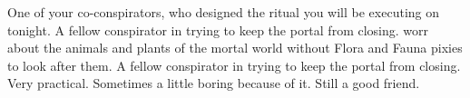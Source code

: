 \documentclass[char]{PP}
\begin{document}
\begin{itemz}[Notes]
	\item 
\end{itemz}

\begin{contacts}
	\contact{\cSLibrarian{}} One of your co-conspirators, who designed the ritual you will be executing on tonight.
	\contact{\cFHeart{}} A fellow conspirator in trying to keep the portal from closing. \cFHeart{\They} worr\cFHeart{\pluralY} about the animals and plants of the mortal world without Flora and Fauna pixies to look after them.
	\contact{\cMIron{}} A fellow conspirator in trying to keep the portal from closing. Very practical. Sometimes a little boring because of it. Still a good friend.
\end{contacts}
\end{document}
